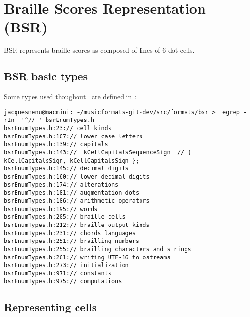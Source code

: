 
\chapter{Braille Scores Representation (BSR)}

BSR represents braille scores as composed of lines of 6-dot cells.


\section{BSR basic types}\label{BSR basic types}

Some types used thoughout \bsrRepr\ are defined in :%
\begin{lstlisting}[language=Terminal]
jacquesmenu@macmini: ~/musicformats-git-dev/src/formats/bsr >  egrep -rIn  '^// ' bsrEnumTypes.h
bsrEnumTypes.h:23:// cell kinds
bsrEnumTypes.h:107:// lower case letters
bsrEnumTypes.h:139:// capitals
bsrEnumTypes.h:143://  kCellCapitalsSequenceSign, // { kCellCapitalsSign, kCellCapitalsSign };
bsrEnumTypes.h:145:// decimal digits
bsrEnumTypes.h:160:// lower decimal digits
bsrEnumTypes.h:174:// alterations
bsrEnumTypes.h:181:// augmentation dots
bsrEnumTypes.h:186:// arithmetic operators
bsrEnumTypes.h:195:// words
bsrEnumTypes.h:205:// braille cells
bsrEnumTypes.h:212:// braille output kinds
bsrEnumTypes.h:231:// chords languages
bsrEnumTypes.h:251:// brailling numbers
bsrEnumTypes.h:255:// brailling characters and strings
bsrEnumTypes.h:261:// writing UTF-16 to ostreams
bsrEnumTypes.h:273:// initialization
bsrEnumTypes.h:971:// constants
bsrEnumTypes.h:975:// computations
\end{lstlisting}


\section{Representing cells}

